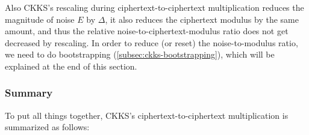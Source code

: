  Also CKKS's rescaling during ciphertext-to-ciphertext multiplication reduces the magnitude of noise $E$ by $\Delta$, it also reduces the ciphertext modulus by the same amount, and thus the relative noise-to-ciphertext-modulus ratio does not get decreased by rescaling. In order to reduce (or reset) the noise-to-modulus ratio, we need to do bootstrapping (\autoref{subsec:ckks-bootstrapping}), which will be explained at the end of this section. %


\subsubsection{Summary}
\label{subsubsec:ckks-mult-cipher-summary}

To put all things together, CKKS's ciphertext-to-ciphertext multiplication is summarized as follows:

